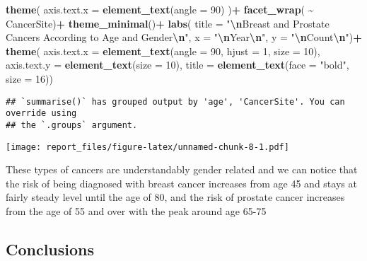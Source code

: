 \documentclass[
]{article}
\newenvironment{Shaded}{\begin{snugshade}}{\end{snugshade}}
\newcommand{\AttributeTok}[1]{\textcolor[rgb]{0.13,0.29,0.53}{#1}}
\newcommand{\DecValTok}[1]{\textcolor[rgb]{0.00,0.00,0.81}{#1}}
\newcommand{\FunctionTok}[1]{\textcolor[rgb]{0.13,0.29,0.53}{\textbf{#1}}}
\newcommand{\NormalTok}[1]{#1}
\newcommand{\SpecialCharTok}[1]{\textcolor[rgb]{0.81,0.36,0.00}{\textbf{#1}}}
\newcommand{\StringTok}[1]{\textcolor[rgb]{0.31,0.60,0.02}{#1}}
\begin{document}
\begin{Shaded}
\begin{Highlighting}[]
  \FunctionTok{theme}\NormalTok{(}
    \AttributeTok{axis.text.x =} \FunctionTok{element\_text}\NormalTok{(}\AttributeTok{angle =} \DecValTok{90}\NormalTok{)}
\NormalTok{  )}\SpecialCharTok{+} 
  \FunctionTok{facet\_wrap}\NormalTok{( }\SpecialCharTok{\textasciitilde{}}\NormalTok{ CancerSite)}\SpecialCharTok{+}
  \FunctionTok{theme\_minimal}\NormalTok{()}\SpecialCharTok{+}
  \FunctionTok{labs}\NormalTok{(}
    \AttributeTok{title =} \StringTok{"}\SpecialCharTok{\textbackslash{}n}\StringTok{Breast and Prostate Cancers }
\StringTok{According to Age and Gender}\SpecialCharTok{\textbackslash{}n}\StringTok{"}\NormalTok{,}
    \AttributeTok{x =} \StringTok{"}\SpecialCharTok{\textbackslash{}n}\StringTok{Year}\SpecialCharTok{\textbackslash{}n}\StringTok{"}\NormalTok{, }
    \AttributeTok{y =} \StringTok{"}\SpecialCharTok{\textbackslash{}n}\StringTok{Count}\SpecialCharTok{\textbackslash{}n}\StringTok{"}\NormalTok{)}\SpecialCharTok{+}
  \FunctionTok{theme}\NormalTok{(}
    \AttributeTok{axis.text.x =} \FunctionTok{element\_text}\NormalTok{(}\AttributeTok{angle =} \DecValTok{90}\NormalTok{, }\AttributeTok{hjust =} \DecValTok{1}\NormalTok{, }\AttributeTok{size =} \DecValTok{10}\NormalTok{),}
  \AttributeTok{axis.text.y =} \FunctionTok{element\_text}\NormalTok{(}\AttributeTok{size =} \DecValTok{10}\NormalTok{),}
  \AttributeTok{title =} \FunctionTok{element\_text}\NormalTok{(}\AttributeTok{face =} \StringTok{"bold"}\NormalTok{, }\AttributeTok{size =} \DecValTok{16}\NormalTok{))}
\end{Highlighting}
\end{Shaded}

\begin{verbatim}
## `summarise()` has grouped output by 'age', 'CancerSite'. You can override using
## the `.groups` argument.
\end{verbatim}

\texttt{[image: report\_files/figure-latex/unnamed-chunk-8-1.pdf]}

These types of cancers are understandably gender related and we can
notice that the risk of being diagnosed with breast cancer increases
from age 45 and stays at fairly steady level until the age of 80, and
the risk of prostate cancer increases from the age of 55 and over with
the peak around age 65-75

\hypertarget{conclusions}{%
\subsection{Conclusions}\label{conclusions}}
\end{document}
